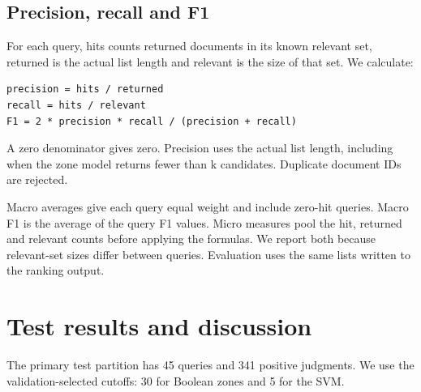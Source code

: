\documentclass[12pt,a4paper]{article}
\begin{document}
\subsection{Precision, recall and F1}
For each query, hits counts returned documents in its known relevant set, returned is the actual list length and relevant is the size of that set. We calculate:

\begin{small}\begin{verbatim}
precision = hits / returned
recall = hits / relevant
F1 = 2 * precision * recall / (precision + recall)
\end{verbatim}\end{small}
A zero denominator gives zero. Precision uses the actual list length, including when the zone model returns fewer than k candidates. Duplicate document IDs are rejected.

Macro averages give each query equal weight and include zero-hit queries. Macro F1 is the average of the query F1 values. Micro measures pool the hit, returned and relevant counts before applying the formulas. We report both because relevant-set sizes differ between queries. Evaluation uses the same lists written to the ranking output.

\section{Test results and discussion}
The primary test partition has 45 queries and 341 positive judgments. We use the validation-selected cutoffs: 30 for Boolean zones and 5 for the SVM.
\end{document}
